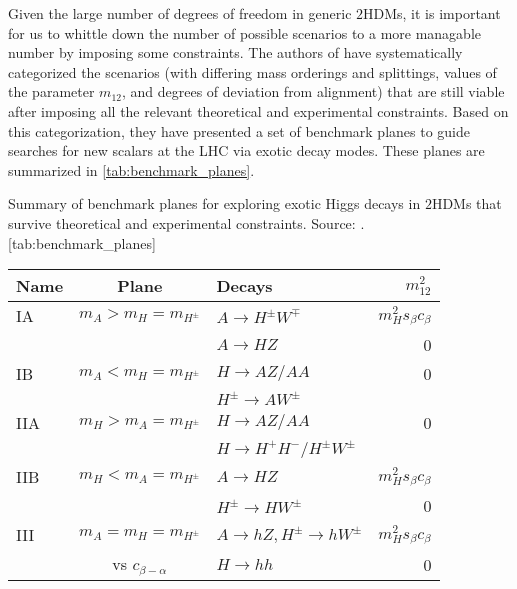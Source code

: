 Given the large number of degrees of freedom in generic $2$HDMs, it is important for us to whittle down the number of possible scenarios to a more managable number by imposing some constraints. The authors of \cite{Kling:2016opi} have systematically categorized the scenarios (with differing mass orderings and splittings, values of the parameter $m_{12}$, and degrees of deviation from alignment) that are still viable after imposing all the relevant theoretical and experimental constraints. Based on this categorization, they have presented a set of benchmark planes to guide searches for new scalars at the LHC via exotic decay modes. These planes are summarized in \autoref{tab:benchmark_planes}. 

\begin{table}
  \centering
  \begin{sidecaption}{Summary of benchmark planes for exploring exotic Higgs decays in $2$HDMs that survive theoretical and experimental constraints. Source: \cite{Kling:2016opi}.}[tab:benchmark_planes]
  \begin{tabular}{lclr}
    \toprule
    Name    & Plane                   & Decays                                    & $m_{12}^2$\\\midrule
    IA      & $m_A > m_H = m_{H^\pm}$ & $A\rightarrow H^\pm W^\mp$                & $m_H^2s_\beta c_\beta$\\
            &                         & $A\rightarrow HZ$                         & 0 \\\midrule
    IB      & $m_A < m_H = m_{H^\pm}$ & $H\rightarrow AZ/AA$                      & 0\\
            &                         & $H^\pm\rightarrow AW^\pm$                 & \\\midrule
    IIA     & $m_H > m_A = m_{H^\pm}$ & $H\rightarrow AZ/AA$                      & 0\\
            &                         & $H\rightarrow H^+H^-/H^\pm W^\pm$         & \\\midrule
    IIB     & $m_H < m_A = m_{H^\pm}$ & $A\rightarrow HZ$                         & $m_H^2s_\beta c_\beta$\\
            &                         & $H^\pm\rightarrow HW^\pm$                 & 0 \\\midrule
    III     & $m_A = m_H = m_{H^\pm}$ & $A\rightarrow hZ,H^\pm\rightarrow hW^\pm$ & $m_H^2s_\beta c_\beta$\\
            & vs $c_{\beta-\alpha}$   & $H\rightarrow hh$                         & 0 \\
    \bottomrule
  \end{tabular}
\end{sidecaption}
\end{table}

